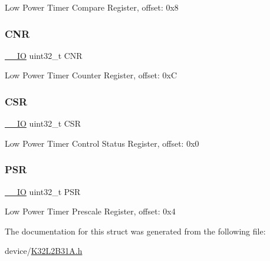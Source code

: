 Low Power Timer Compare Register, offset\+: 0x8 \mbox{\label{struct_l_p_t_m_r___type_afabfe869c2da8a9974cac1da36481312}} 
\subsubsection{\texorpdfstring{CNR}{CNR}}
{\footnotesize\ttfamily \mbox{\hyperlink{core__cm0plus_8h_aec43007d9998a0a0e01faede4133d6be}{\+\_\+\+\_\+\+IO}} uint32\+\_\+t C\+NR}

Low Power Timer Counter Register, offset\+: 0xC \mbox{\label{struct_l_p_t_m_r___type_a876dd0a8546697065f406b7543e27af2}} 
\subsubsection{\texorpdfstring{CSR}{CSR}}
{\footnotesize\ttfamily \mbox{\hyperlink{core__cm0plus_8h_aec43007d9998a0a0e01faede4133d6be}{\+\_\+\+\_\+\+IO}} uint32\+\_\+t C\+SR}

Low Power Timer Control Status Register, offset\+: 0x0 \mbox{\label{struct_l_p_t_m_r___type_a909d70d4d88dd6731a07b76a21c8214b}} 
\subsubsection{\texorpdfstring{PSR}{PSR}}
{\footnotesize\ttfamily \mbox{\hyperlink{core__cm0plus_8h_aec43007d9998a0a0e01faede4133d6be}{\+\_\+\+\_\+\+IO}} uint32\+\_\+t P\+SR}

Low Power Timer Prescale Register, offset\+: 0x4 

The documentation for this struct was generated from the following file\+:\begin{DoxyCompactItemize}
\item 
device/\mbox{\hyperlink{_k32_l2_b31_a_8h}{K32\+L2\+B31\+A.\+h}}\end{DoxyCompactItemize}
